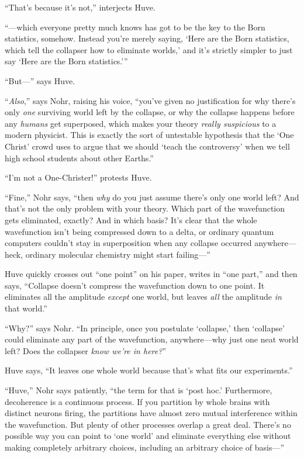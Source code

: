 {
 ``That's because
it's not,'' interjects Huve.}

{
 ``---which everyone pretty much knows has got to
be the key to the Born statistics, somehow. Instead
you're merely saying, `Here are the Born
statistics, which tell the collapser how to eliminate
worlds,' and it's strictly simpler to
just say `Here are the Born
statistics.'''}

{
 ``But---'' says Huve.}

{
 ``\textit{Also},'' says Nohr,
raising his voice, ``you've given no
justification for why there's only \textit{one}
surviving world left by the collapse, or why the collapse happens
before any \textit{humans} get superposed, which makes your theory
\textit{really suspicious} to a modern physicist. This is exactly the
sort of untestable hypothesis that the `One
Christ' crowd uses to argue that we should
`teach the controversy' when we tell
high school students about other Earths.''}

{
 ``I'm not a
One-Christer!'' protests Huve.}

{
 ``Fine,'' Nohr says,
``then \textit{why} do you just assume
there's only one world left? And that's
not the only problem with your theory. Which part of the wavefunction
gets eliminated, exactly? And in which basis? It's
clear that the whole wavefunction isn't being
compressed down to a delta, or ordinary quantum computers
couldn't stay in superposition when any collapse
occurred anywhere---heck, ordinary molecular chemistry might start
failing---''}

{
 Huve quickly crosses out ``one
point'' on his paper, writes in
``one part,'' and then says,
``Collapse doesn't compress the
wavefunction down to one point. It eliminates all the amplitude
\textit{except} one world, but leaves \textit{all} the amplitude
\textit{in} that world.''}

{
 ``Why?'' says Nohr.
``In principle, once you postulate
`collapse,' then
`collapse' could eliminate any part of
the wavefunction, anywhere---why just one neat world left? Does the
collapser \textit{know we're in
here?}''}

{
 Huve says, ``It leaves one whole world because
that's what fits our experiments.''}

{
 ``Huve,'' Nohr says patiently,
``the term for that is `post
hoc.' Furthermore, decoherence is a continuous process.
If you partition by whole brains with distinct neurons firing, the
partitions have almost zero mutual interference within the
wavefunction. But plenty of other processes overlap a great deal.
There's no possible way you can point to
`one world' and eliminate everything
else without making completely arbitrary choices, including an
arbitrary choice of basis---''}

